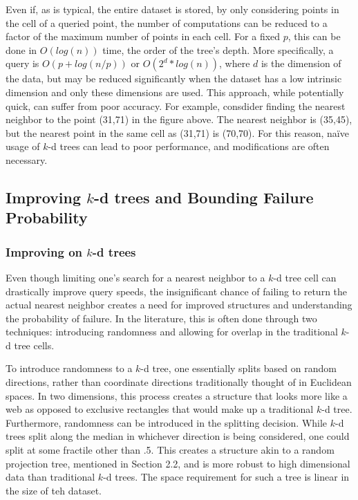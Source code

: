 Even if, as is typical, the entire dataset is stored, by only considering points in the cell of a queried point, the number of computations can be reduced to a factor of the maximum number of points in each cell. For a fixed $p$, this can be done in $O(log(n))$ time, the order of the tree's depth. More specifically, a query is $O(p+log(n/p))$ or $O(2^d*log(n))$, where $d$ is the dimension of the data, but may be reduced significantly when the dataset has a low intrinsic dimension and only these dimensions are used. This approach, while potentially quick, can suffer from poor accuracy. For example, consdider finding the nearest neighbor to the point (31,71) in the figure above. The nearest neighbor is (35,45), but the nearest point in the same cell as (31,71) is (70,70). For this reason, naïve usage of $k$-d trees can lead to poor performance, and modifications are often necessary. 

\subsection{Improving $k$-d trees and Bounding Failure Probability} 
\subsubsection{Improving on $k$-d trees}
Even though limiting one's search for a nearest neighbor to a $k$-d tree cell can drastically improve query speeds, the insignificant chance of failing to return the actual nearest neighbor creates a need for improved structures and understanding the probability of failure. In the literature, this is often done through two techniques: introducing randomness and allowing for overlap in the traditional $k$-d tree cells.

To introduce randomness to a $k$-d tree, one essentially splits based on random directions, rather than coordinate directions traditionally thought of in Euclidean spaces. In two dimensions, this process creates a structure that looks more like a web as opposed to exclusive rectangles that would make up a traditional $k$-d tree. Furthermore, randomness can be introduced in the splitting decision. While $k$-d trees split along the median in whichever direction is being considered, one could split at some fractile other than .5. This creates a structure akin to a random projection tree, mentioned in Section 2.2, and is more robust to high dimensional data than traditional $k$-d trees. The space requirement for such a tree is linear in the size of teh dataset.

